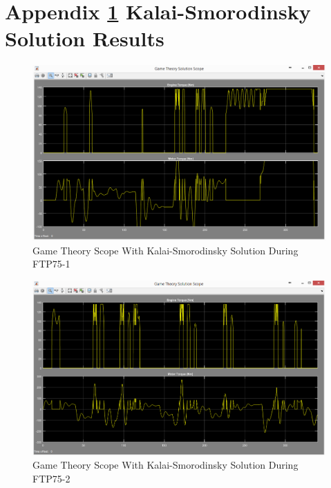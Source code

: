 \chapter{Appendix \ref{app:3} Kalai-Smorodinsky Solution Results}
\label{app:3}

\begin{figure}[h]
\centering
\includegraphics[scale=0.47]{figures/KalaiSmorodinsky/FTP75-1/gameTheory23Juni}
\caption{Game Theory Scope With Kalai-Smorodinsky Solution During FTP75-1}
\label{fig:gtks1}
\end{figure}

\begin{figure}[h]
\centering
\includegraphics[scale=0.47]{figures/KalaiSmorodinsky/FTP75-2/gameTheory23Juni}
\caption{Game Theory Scope With Kalai-Smorodinsky Solution During FTP75-2}
\label{fig:gtks2}
\end{figure}

